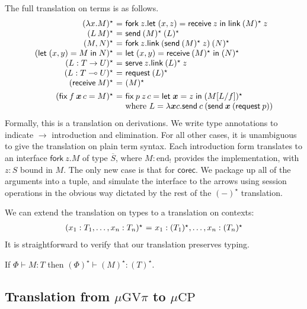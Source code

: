 \documentclass[orivec,envcountsame]{llncs}
\makeatletter
\newcommand{\gvdual}[1]{\overline{#1}}
\newcommand{\lto}{\ensuremath{\multimap}}
\newcommand{\uto}{\ensuremath{\rightarrow}}
\newcommand{\outterm}{\mathrm{end}_!}
\newcommand{\gvtyp}[3]{#1 \vdash #2 : #3}
\newcommand{\mkwd}[1]{\mathsf{#1}}
\newcommand{\gvsend}[2]{\mkwd{send}\:#1\:#2}
\newcommand{\gvreceive}[1]{\mkwd{receive}\:#1}
\newcommand{\gvlet}[3]{\mkwd{let}\;#1 = #2\;\mkwd{in}\;#3}
\newcommand{\gvlink}[2]{\mkwd{link}\:#1\:#2}
\newcommand{\gvfork}[2]{\mkwd{fork}\:#1.#2}
\newcommand{\lrkwd}{\mkwd{fix}}
\newcommand{\gvfix}[3]{\lrkwd\:#1\:#2 = #3}
\newcommand{\gvserve}[2]{\mkwd{serve}\:#1.#2}
\newcommand{\gvrequest}[1]{\mkwd{request}\:#1}
\newcommand{\key}{\mkwd}
\newcommand{\topi}[1]{({#1})^\star}
\newcommand{\mucp}{$\mu\mathrm{CP}$\xspace}
\newcommand{\gvpi}{$\mu\mathrm{GV}\pi$\xspace}
\newcommand{\ba}{\begin{array}}
\newcommand{\ea}{\end{array}}
\newenvironment{equations}{\[\ba{@{}r@{~}c@{~}l@{}}}{\ea\]}
\makeatother
\begin{document}
The full translation on terms is as follows.
\begin{equations}
\topi{\lambda x.M} &=& \gvfork{z}{\gvlet{(x, z)}{\gvreceive{z}}{\gvlink{\topi{M}}{z}}} \\
\topi{L\,M} &=& \gvsend{\topi{M}}{\topi{L}} \\
\topi{M, N} &=&
  \gvfork{z}
    {\gvlink{(\gvsend{\topi{M}}{z})}{\topi{N}}} \\
\topi{\gvlet{(x, y)}{M}{N}} &=&
    \gvlet{(x, y)}{\gvreceive{\topi{M}}}{\topi{N}} \\
\topi{L : T \uto U} &=&
  \gvserve{z}{\gvlink{\topi{L}}{z}} \\
\topi{L : T \lto U} &=& \gvrequest{\topi{L}} \\
\topi{\gvreceive{M}} &=& \topi{M}
\\[1ex]
\topi{\gvfix{f}{\vec{x}\,c}{M}} &=&
  \gvfix{p}{z\,c}{\gvlet{\vec{x}}{z}{\topi{M[L/f]}}} \\
&& \text{where }L = \lambda \vec{x} c.\gvsend{c}{(\gvsend{\vec{x}}{(\gvrequest{p})})} \\
\end{equations}%
Formally, this is a translation on derivations. We write type
annotations to indicate $\to$ introduction and elimination. For all
other cases, it is unambiguous to give the translation on plain term
syntax. Each introduction form translates to an interface
$\gvfork{z}{M}$ of type $\gvdual{S}$, where $M : \outterm$ provides
the implementation, with $z : S$ bound in $M$.
%
The only new case is that for $\key{corec}$. We package up all of the
arguments into a tuple, and simulate the interface to the arrows using
session operations in the obvious way dictated by the rest of the
$\topi{-}$ translation.

We can extend the translation on types to a translation on contexts:
\begin{equations}
\topi{x_1:T_1, \dots, x_n:T_n} &=& x_1:\topi{T_1}, \dots, x_n:\topi{T_n} \\
\end{equations}%
It is straightforward to verify that our translation preserves typing.
\begin{theorem}
If $\gvtyp{\Phi}{M}{T}$ then $\gvtyp{\topi{\Phi}}{\topi{M}}{\topi{T}}$.
\end{theorem}

\subsection{Translation from \gvpi to \mucp}\label{sec:gvpitocp}
\end{document}
